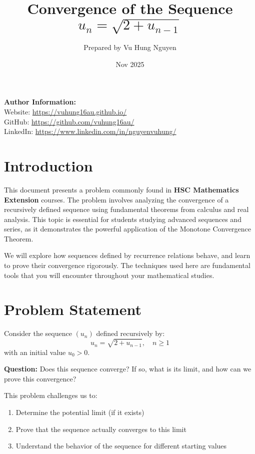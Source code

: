 \documentclass[12pt,a4paper]{article}
\title{Convergence of the Sequence $u_n = \sqrt{2 + u_{n-1}}$}
\author{Prepared by Vu Hung Nguyen}
\date{Nov 2025}
\theoremstyle{definition}
\begin{document}
\maketitle

\noindent\textbf{Author Information:}\\
\noindent Website: \url{https://vuhung16au.github.io/}\\
\noindent GitHub: \url{https://github.com/vuhung16au/}\\
\noindent LinkedIn: \url{https://www.linkedin.com/in/nguyenvuhung/}

\vspace{0.5cm}

\section{Introduction}

This document presents a problem commonly found in \textbf{HSC Mathematics Extension} courses. The problem involves analyzing the convergence of a recursively defined sequence using fundamental theorems from calculus and real analysis. This topic is essential for students studying advanced sequences and series, as it demonstrates the powerful application of the Monotone Convergence Theorem.

We will explore how sequences defined by recurrence relations behave, and learn to prove their convergence rigorously. The techniques used here are fundamental tools that you will encounter throughout your mathematical studies.

\section{Problem Statement}

Consider the sequence $(u_n)$ defined recursively by:
\begin{equation}
u_n = \sqrt{2 + u_{n-1}}, \quad n \geq 1
\end{equation}
with an initial value $u_0 > 0$.

\textbf{Question:} Does this sequence converge? If so, what is its limit, and how can we prove this convergence?

This problem challenges us to:
\begin{enumerate}[label=\roman*)]
    \item Determine the potential limit (if it exists)
    \item Prove that the sequence actually converges to this limit
    \item Understand the behavior of the sequence for different starting values
\end{enumerate}
\end{document}
